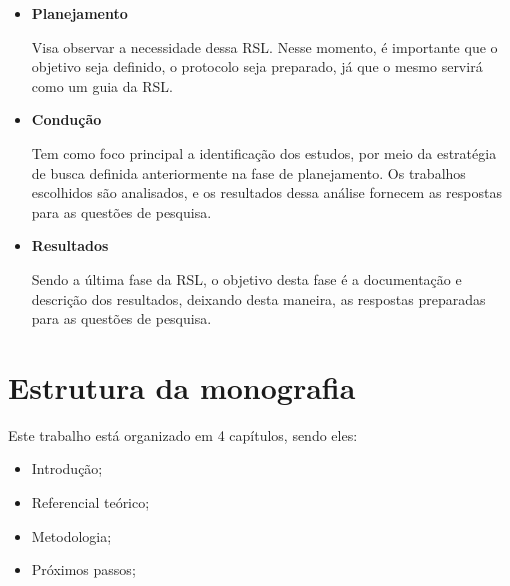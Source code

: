 \begin{itemize}
	\item \textbf{Planejamento}
	
	Visa observar a necessidade dessa RSL. Nesse momento, é importante que o objetivo seja definido, o protocolo seja preparado, já que o mesmo servirá como um guia da RSL.
	
	\item \textbf{Condução}
	
	Tem como foco principal a identificação dos estudos, por meio da estratégia de busca definida anteriormente na fase de planejamento. Os trabalhos escolhidos são analisados, e os resultados dessa análise fornecem as respostas para as questões de pesquisa.
	
	
	\item \textbf{Resultados}
	
	Sendo a última fase da RSL, o objetivo desta fase é a documentação e descrição dos resultados, deixando desta maneira, as respostas preparadas para as questões de pesquisa.
\end{itemize}

\section{Estrutura da monografia}

Este trabalho está organizado em 4 capítulos, sendo eles:

\begin{itemize}
	\item Introdução;
	
	\item Referencial teórico;
	
	\item Metodologia;
	
	\item Próximos passos;
\end{itemize}
